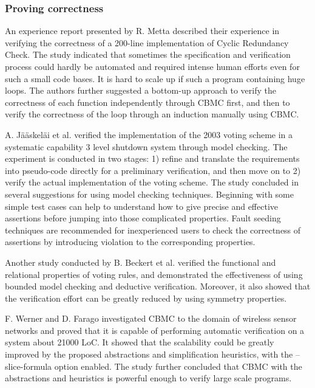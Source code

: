 \subsubsection{Proving correctness}
An experience report presented by R. Metta \cite{Metta:2011:VCO:2004685.2005455} described their experience in verifying the correctness of a 200-line implementation of Cyclic Redundancy Check. The study indicated that sometimes the specification and verification process could hardly be automated and required intense human efforts even for such a small code bases. It is hard to scale up if such a program containing huge loops. The authors further suggested a bottom-up approach to verify the correctness of each function independently through CBMC first, and then to verify the correctness of the loop through an induction manually using CBMC. 

A. J{\"a}{\"a}skel{\"a}i et al. \cite{jskelinen_et_al:OASIcs:2012:3589} verified the implementation of the 2003 voting scheme in a systematic capability 3 level shutdown system through model checking. The experiment is conducted in two stages: 1) refine and translate the requirements into pseudo-code directly for a preliminary verification, and then move on to 2) verify the actual implementation of the voting scheme. The study concluded in several suggestions for using model checking techniques. Beginning with some simple test cases can help to understand how to give precise and effective assertions before jumping into those complicated properties. Fault seeding techniques are recommended for inexperienced users to check the correctness of assertions by introducing violation to the corresponding properties. 

Another study conducted by B. Beckert et al. \cite{beckertBormerKirsten2016} verified the functional and relational properties of voting rules, and demonstrated the effectiveness of using bounded model checking and deductive verification. Moreover, it also showed that the verification effort can be greatly reduced by using symmetry properties. 

F. Werner and D. Farago \cite{Werner2010CorrectnessOS} investigated CBMC to the domain of wireless sensor networks and proved that it is capable of performing automatic verification on a system about 21000 LoC. It showed that the scalability could be greatly improved by the proposed abstractions and simplification heuristics, with the --slice-formula option enabled. The study further concluded that CBMC with the abstractions and heuristics is powerful enough to verify large scale programs. 

